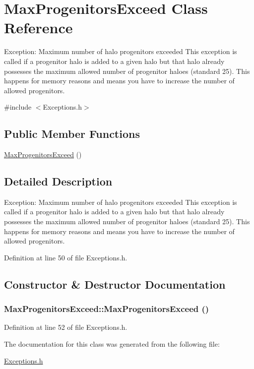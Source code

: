 \section{MaxProgenitorsExceed Class Reference}
\label{classMaxProgenitorsExceed}


Exception: Maximum number of halo progenitors exceeded This exception is called if a progenitor halo is added to a given halo but that halo already possesses the maximum allowed number of progenitor haloes (standard 25). This happens for memory reasons and means you have to increase the number of allowed progenitors.  




{\ttfamily \#include $<$Exceptions.h$>$}

\subsection*{Public Member Functions}
\begin{DoxyCompactItemize}
\item 
\hyperlink{classMaxProgenitorsExceed_a1eeb86fcbd5002a573dc8278790dc7ea}{MaxProgenitorsExceed} ()
\end{DoxyCompactItemize}


\subsection{Detailed Description}
Exception: Maximum number of halo progenitors exceeded This exception is called if a progenitor halo is added to a given halo but that halo already possesses the maximum allowed number of progenitor haloes (standard 25). This happens for memory reasons and means you have to increase the number of allowed progenitors. 

Definition at line 50 of file Exceptions.h.



\subsection{Constructor \& Destructor Documentation}
\subsubsection[{MaxProgenitorsExceed}]{\setlength{\rightskip}{0pt plus 5cm}MaxProgenitorsExceed::MaxProgenitorsExceed ()}\label{classMaxProgenitorsExceed_a1eeb86fcbd5002a573dc8278790dc7ea}


Definition at line 52 of file Exceptions.h.



The documentation for this class was generated from the following file:\begin{DoxyCompactItemize}
\item 
\hyperlink{Exceptions_8h}{Exceptions.h}\end{DoxyCompactItemize}
